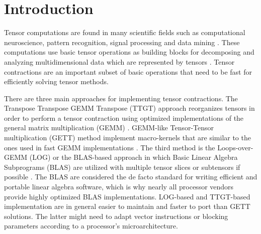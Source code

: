 \section{Introduction}
\label{sec:introduction}
Tensor computations are found in many scientific fields such as computational neuroscience, pattern recognition, signal processing and data mining \citep{karahan:2015:tensor, papalexakis:2017:tensors, song:2019:tensor.completion, rieser:2023:tensor, wang:2023:tensor.decomposition}.
These computations use basic tensor operations as building blocks for decomposing and analyzing multidimensional data which are represented by tensors \citep{lee:2018:fundamental, kolda:2009:decompositions}. 
Tensor contractions are an important subset of basic operations that need to be fast for efficiently solving tensor methods.

There are three main approaches for implementing tensor contractions.
The Transpose Transpose GEMM Transpose (TTGT) approach reorganizes tensors in order to perform a tensor contraction using optimized implementations of the general matrix multiplication (GEMM) \citep{bader:2006:algorithm862,solomonik:2013:cyclops}.
GEMM-like Tensor-Tensor multiplication (GETT) method implement macro-kernels that are similar to the ones used in fast GEMM implementations \citep{springer:2018:design, matthews:2018:high}.
The third method is the Loops-over-GEMM (LOG) or the BLAS-based approach in which Basic Linear Algebra Subprograms (BLAS) are utilized with multiple tensor slices or subtensors if possible \citep{dinapoli:2014:towards.efficient.use, li:2015:input, shi:2016:tensor.contraction, bassoy:2019:ttv}.
The BLAS are considered the de facto standard for writing efficient and portable linear algebra software, which is why nearly all processor vendors provide highly optimized BLAS implementations.
LOG-based and TTGT-based implementation are in general easier to maintain and faster to port than GETT solutions.
The latter might need to adapt vector instructions or blocking parameters according to a processor's microarchitecture.


